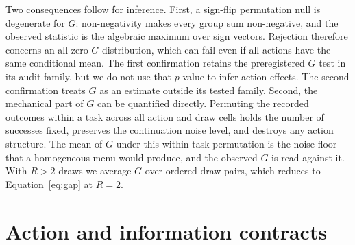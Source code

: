 Two consequences follow for inference. First, a sign-flip permutation null is degenerate for $G$: non-negativity makes every group sum non-negative, and the observed statistic is the algebraic maximum over sign vectors. Rejection therefore concerns an all-zero $G$ distribution, which can fail even if all actions have the same conditional mean. The first confirmation retains the preregistered $G$ test in its audit family, but we do not use that $p$ value to infer action effects. The second confirmation treats $G$ as an estimate outside its tested family. Second, the mechanical part of $G$ can be quantified directly. Permuting the recorded outcomes within a task across all action and draw cells holds the number of successes fixed, preserves the continuation noise level, and destroys any action structure. The mean of $G$ under this within-task permutation is the noise floor that a homogeneous menu would produce, and the observed $G$ is read against it. With $R>2$ draws we average $G$ over ordered draw pairs, which reduces to Equation~\ref{eq:gap} at $R=2$.

\section{Action and information contracts}
\label{app:actions}

